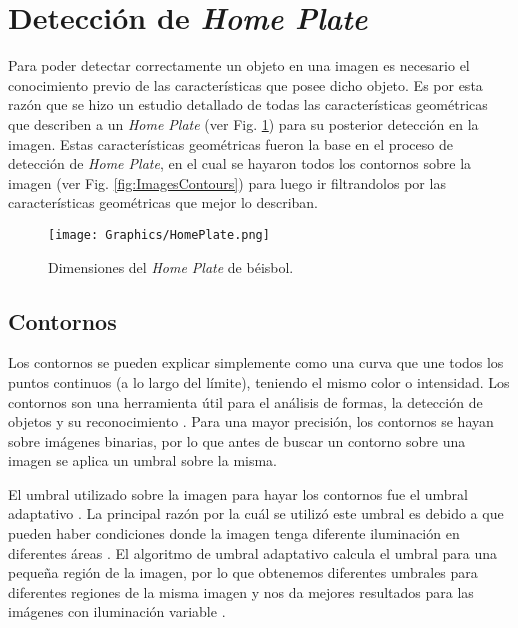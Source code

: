 \section{Detección de \textit{Home Plate}}

Para poder detectar correctamente un objeto en una imagen es necesario el conocimiento previo de las características que posee dicho objeto. Es por esta razón que se hizo un estudio detallado de todas las características geométricas que describen a un \textit{Home Plate} (ver Fig. \ref{fig:HomePlateDimentions}) para su posterior detección en la imagen. Estas características geométricas fueron la base en el proceso de detección de \textit{Home Plate}, en el cual se hayaron todos los contornos sobre la imagen (ver Fig. \ref{fig:ImagesContours}) para luego ir filtrandolos por las características geométricas que mejor lo describan.

\begin{figure}[!h]
    \centering
    \texttt{[image: Graphics/HomePlate.png]}
    \caption{Dimensiones del \textit{Home Plate} de béisbol.}
    \label{fig:HomePlateDimentions}
\end{figure}

\subsection{Contornos}

Los contornos se pueden explicar simplemente como una curva que une todos los puntos continuos (a lo largo del límite), teniendo el mismo color o intensidad. Los contornos son una herramienta útil para el análisis de formas, la detección de objetos y su reconocimiento \cite{Contours}. Para una mayor precisión, los contornos se hayan sobre imágenes binarias, por lo que antes de buscar un contorno sobre una imagen se aplica un umbral sobre la misma.

El umbral utilizado sobre la imagen para hayar los contornos fue el umbral adaptativo \cite{AdaptiveThreshold}. La principal razón por la cuál se utilizó este umbral es debido a que pueden haber condiciones donde la imagen tenga diferente iluminación en diferentes áreas \cite{AdaptiveThresholdOpenCV}. El algoritmo de umbral adaptativo calcula el umbral para una pequeña región de la imagen, por lo que obtenemos diferentes umbrales para diferentes regiones de la misma imagen y nos da mejores resultados para las imágenes con iluminación variable \cite{AdaptiveThresholdOpenCV}.

